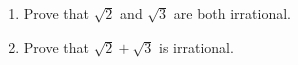 \begin{enumerate}
\item[(a)] Prove that $\sqrt2$ and $\sqrt3$ are both irrational.
\item[(b)] Prove that $\sqrt2+\sqrt3$ is irrational.
\end{enumerate}
